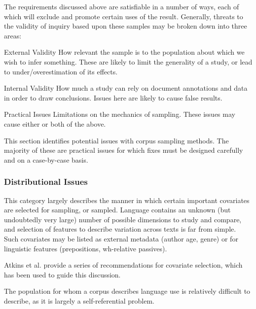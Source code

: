 

The requirements discussed above are satisfiable in a number of ways, each of which will exclude and promote certain uses of the result.  Generally, threats to the validity of inquiry based upon these samples may be broken down into three areas:

\begin{itemizeTitle}
    \item[External Validity] How relevant the sample is to the population about which we wish to infer something.  These are likely to limit the generality of a study, or lead to under/overestimation of its effects.
    \item[Internal Validity] How much a study can rely on document annotations and data in order to draw conclusions.  Issues here are likely to cause false results.
    \item[Practical Issues] Limitations on the mechanics of sampling.  These issues may cause either or both of the above.
\end{itemizeTitle}

This section identifies potential issues with corpus sampling methods.  The majority of these are practical issues for which fixes must be designed carefully and on a case-by-case basis.


\subsubsection{Distributional Issues}
This category largely describes the manner in which certain important covariates are selected for sampling, or sampled.  Language contains an unknown (but undoubtedly very large) number of possible dimensions to study and compare, and selection of features to describe variation across texts is far from simple.  Such covariates may be listed as external metadata (author age, genre) or for linguistic features (prepositions, wh-relative passives).

Atkins et al.\cite{atkins1992corpus} provide a series of recommendations for covariate selection, which has been used to guide this discussion.

The population for whom a corpus describes language use is relatively difficult to describe, as it is largely a self-referential problem.

